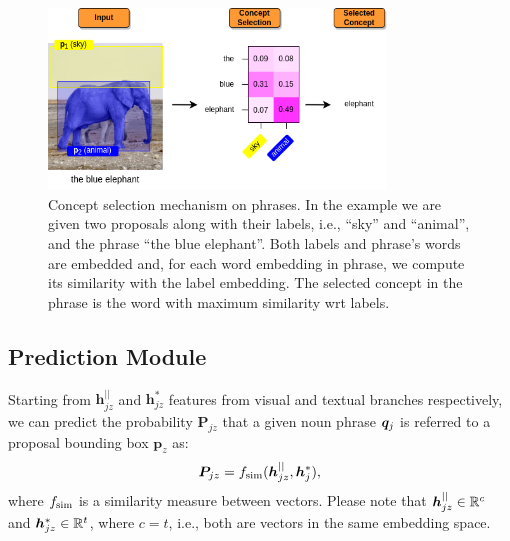 \begin{figure}
  \centering
  \includegraphics[width=0.8\textwidth]{figures/concept-selection-example.png}
  \caption[Concept selection mechanism on phrases]{Concept selection
  mechanism on phrases. In the example we are given two proposals
  along with their labels, i.e., ``sky'' and ``animal'', and the
  phrase ``the blue elephant''. Both labels and phrase's words are
  embedded and, for each word embedding in phrase, we compute its
  similarity with the label embedding. The selected concept in the
  phrase is the word with maximum similarity wrt labels. }
  \label{fig:concept-selection-example}
\end{figure}

\subsection{Prediction Module}
\label{subsec:prediction-module}

Starting from $\bm{h}^{||}_{jz}$ and $\bm{h}^*_{jz}$ features from
visual and textual branches respectively, we can predict the
probability $\bm{P}_{jz}$ that a given noun phrase $\bm{q}_j$ is referred
to a proposal bounding box $\bm{p}_z$ as:
\begin{equation}
  \bm{P}_{jz} = f_{\text{sim}} ( \bm{h}^{||}_{jz} , \bm{h}^*_j ),
\end{equation}
where $f_{\text{sim}}$ is a similarity measure between vectors. Please note
that $\bm{h}^{||}_{jz} \in \mathbb{R}^c$ and $\bm{h}^*_{jz} \in \mathbb{R}^t$,
where $c = t$, i.e., both are vectors in the same embedding space.

